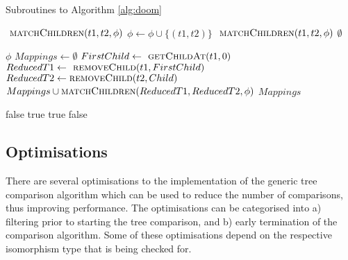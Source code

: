 \begin{algorithm}
\caption{Subroutines to Algorithm \ref{alg:doom}}
\begin{algorithmic}[1]                  
		\State \Return $ \textsc{ matchChildren}(t1,t2,\phi) $
	\EndIf
		\State $ \phi \gets \phi \cup \{(t1,t2)\} $
		\State \Return $ \textsc{ matchChildren}(t1,t2,\phi) $
	\EndIf
	\State \Return $\emptyset$
\EndFunction    

\item[]

    	\State \Return $\phi$
    \EndIf
    \State $ Mappings \gets \emptyset $
    \State $ FirstChild \gets \textsc{ getChildAt} (t1, 0)  $
    \State $ ReducedT1 \gets \textsc{ removeChild} (t1, FirstChild) 	$
    	\State $ ReducedT2 \gets \textsc{removeChild} (t2, Child) $
    			\State $ Mappings \cup \textsc{matchChildren} (ReducedT1,ReducedT2,\phi) $
			\EndFor
	\EndFor
	\State \Return $Mappings$
\EndFunction    

\item[]

    	\State \Return false
		\State \Return true
		\State \Return true
	\EndIf
	\State \Return false
\EndFunction    

\end{algorithmic}   
\label{alg:subroutines}            
\end{algorithm}

\subsection{Optimisations}
There are several optimisations to the implementation of the generic tree comparison algorithm which can be used to reduce the number of comparisons, thus improving performance. The optimisations can be categorised into a) filtering prior to starting the tree comparison, and b) early termination of the comparison algorithm. Some of these optimisations depend on the respective isomorphism type that is being checked for.


